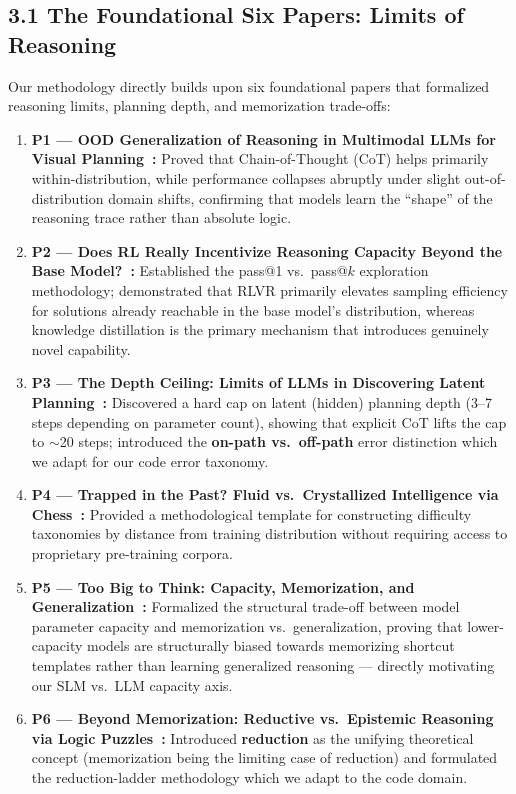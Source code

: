 \documentclass[12pt, a4paper]{article}
\begin{document}
\subsection{3.1 The Foundational Six Papers: Limits of Reasoning}

Our methodology directly builds upon six foundational papers that formalized reasoning limits, planning depth, and memorization trade-offs:

\begin{enumerate}[leftmargin=1.5em, itemsep=6pt]
  \item \textbf{P1 --- OOD Generalization of Reasoning in Multimodal LLMs for Visual Planning~\cite{ood_visual_planning}:} Proved that Chain-of-Thought (CoT) helps primarily within-distribution, while performance collapses abruptly under slight out-of-distribution domain shifts, confirming that models learn the ``shape'' of the reasoning trace rather than absolute logic.
  \item \textbf{P2 --- Does RL Really Incentivize Reasoning Capacity Beyond the Base Model?~\cite{rlvr_limits}:} Established the pass@1 vs.\ pass@$k$ exploration methodology; demonstrated that RLVR primarily elevates sampling efficiency for solutions already reachable in the base model's distribution, whereas knowledge distillation is the primary mechanism that introduces genuinely novel capability.
  \item \textbf{P3 --- The Depth Ceiling: Limits of LLMs in Discovering Latent Planning~\cite{depth_ceiling}:} Discovered a hard cap on latent (hidden) planning depth (3--7 steps depending on parameter count), showing that explicit CoT lifts the cap to $\sim$20 steps; introduced the \textbf{on-path vs.\ off-path} error distinction which we adapt for our code error taxonomy.
  \item \textbf{P4 --- Trapped in the Past? Fluid vs.\ Crystallized Intelligence via Chess~\cite{trapped_in_past}:} Provided a methodological template for constructing difficulty taxonomies by distance from training distribution without requiring access to proprietary pre-training corpora.
  \item \textbf{P5 --- Too Big to Think: Capacity, Memorization, and Generalization~\cite{too_big_to_think}:} Formalized the structural trade-off between model parameter capacity and memorization vs.\ generalization, proving that lower-capacity models are structurally biased towards memorizing shortcut templates rather than learning generalized reasoning --- directly motivating our SLM vs.\ LLM capacity axis.
  \item \textbf{P6 --- Beyond Memorization: Reductive vs.\ Epistemic Reasoning via Logic Puzzles~\cite{beyond_memorization}:} Introduced \textbf{reduction} as the unifying theoretical concept (memorization being the limiting case of reduction) and formulated the reduction-ladder methodology which we adapt to the code domain.
\end{enumerate}
\end{document}
